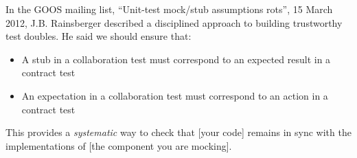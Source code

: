 In the GOOS mailing list, “Unit-test mock/stub assumptions rots”, 15 March 2012, J.B. Rainsberger described a disciplined approach to building trustworthy test doubles. He said we should ensure that:

\begin{framed}
\begin{itemize}
    \item A stub in a collaboration test must correspond to an expected result in a contract test
    \item An expectation in a collaboration test must correspond to an action in a contract test
\end{itemize}

This provides a \emph{systematic} way to check that [your code] remains in sync with the implementations of [the component you are mocking].
    
\end{framed}
